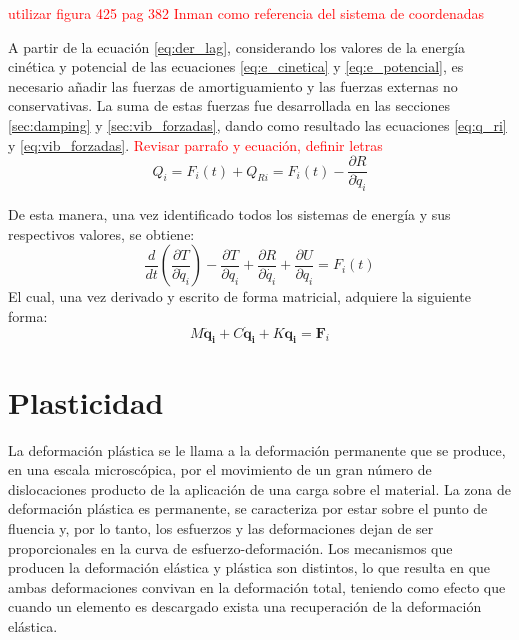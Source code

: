 \textcolor{red}{utilizar figura 425 pag 382 Inman como referencia del sistema de coordenadas}



A partir de la ecuación \ref{eq:der_lag}, considerando los valores de la energía cinética y potencial de las ecuaciones \ref{eq:e_cinetica} y \ref{eq:e_potencial}, es necesario añadir las fuerzas de amortiguamiento y las fuerzas externas no conservativas. La suma de estas fuerzas fue desarrollada en las secciones \ref{sec:damping} y \ref{sec:vib_forzadas}, dando como resultado las ecuaciones \ref{eq:q_ri} y \ref{eq:vib_forzadas}. \textcolor{red}{Revisar parrafo y ecuación, definir letras}
\begin{equation}
	Q_i = F_i(t) + Q_{Ri} = F_i(t) - \frac{\partial R}{\partial \dot{q}_i} 
\end{equation}

De esta manera, una vez identificado todos los sistemas de energía y sus respectivos valores, se obtiene:
\begin{equation}
	\frac{d}{dt}\left(\frac{\partial T}{\partial \dot{q}_i}\right) - \frac{\partial T}{\partial q_i} + \frac{\partial R}{\partial \dot{q_i}} + \frac{\partial U}{\partial q_i} = F_i(t)
\end{equation}
El cual, una vez derivado y escrito de forma matricial, adquiere la siguiente forma:
\begin{equation}
	\mathit{M}\mathbf{\ddot{q}_i} + \mathit{C}\mathbf{\dot{q}_i} + \mathit{K}\mathbf{q_i} = \mathbf{F}_i
\end{equation}

\section{Plasticidad}
La deformación plástica se le llama a la deformación permanente que se produce, en una escala microscópica, por el movimiento de un gran número de dislocaciones producto de la aplicación de una carga sobre el material. La zona de deformación plástica es permanente, se caracteriza por estar sobre el punto de fluencia y, por lo tanto, los esfuerzos y las deformaciones dejan de ser proporcionales en la curva de esfuerzo-deformación. Los mecanismos que producen la deformación elástica y plástica son distintos, lo que resulta en que ambas deformaciones convivan en la deformación total, teniendo como efecto que cuando un elemento es descargado exista una recuperación de la deformación elástica. 

